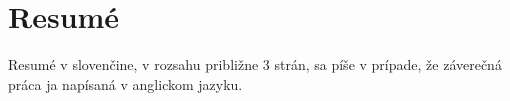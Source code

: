 \chapter{Resumé}
\label{ch:resume}

Resumé v slovenčine, v rozsahu približne 3 strán, sa píše v prípade, že 
záverečná práca ja napísaná v anglickom jazyku.